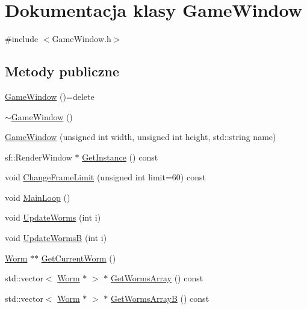 \hypertarget{class_game_window}{}\section{Dokumentacja klasy Game\+Window}
\label{class_game_window}


{\ttfamily \#include $<$Game\+Window.\+h$>$}

\subsection*{Metody publiczne}
\begin{DoxyCompactItemize}
\item 
\mbox{\hyperlink{class_game_window_aeb8fe4d63cdd9e9d3e6fdcb35d15a37c}{Game\+Window}} ()=delete
\item 
\mbox{\hyperlink{class_game_window_a55b071c0390e45c064a160c1e6baaa08}{$\sim$\+Game\+Window}} ()
\item 
\mbox{\hyperlink{class_game_window_a22da49d930c2fd26888b223049a9da18}{Game\+Window}} (unsigned int width, unsigned int height, std\+::string name)
\item 
sf\+::\+Render\+Window $\ast$ \mbox{\hyperlink{class_game_window_aa5ef8ededf54c333a5b19344b95220de}{Get\+Instance}} () const
\item 
void \mbox{\hyperlink{class_game_window_af2b8df98b008a25d8c64f67cd6f23f59}{Change\+Frame\+Limit}} (unsigned int limit=60) const
\item 
void \mbox{\hyperlink{class_game_window_a7dcdd3731da278a522c59a72ecee77b3}{Main\+Loop}} ()
\item 
void \mbox{\hyperlink{class_game_window_a043804fa483c8ea2f348b6fb1dac4e4a}{Update\+Worms}} (int i)
\item 
void \mbox{\hyperlink{class_game_window_aa6659ccbd2a5d27141eb3f00fdc72ea6}{Update\+WormsB}} (int i)
\item 
\mbox{\hyperlink{class_worm}{Worm}} $\ast$$\ast$ \mbox{\hyperlink{class_game_window_a172c7184152f5c49a5089205ae3528f5}{Get\+Current\+Worm}} ()
\item 
std\+::vector$<$ \mbox{\hyperlink{class_worm}{Worm}} $\ast$ $>$ $\ast$ \mbox{\hyperlink{class_game_window_a7535403f5d3ab3ffe22c711665102052}{Get\+Worms\+Array}} () const
\item 
std\+::vector$<$ \mbox{\hyperlink{class_worm}{Worm}} $\ast$ $>$ $\ast$ \mbox{\hyperlink{class_game_window_ab9695e10e5a991a9df920911402b9272}{Get\+Worms\+ArrayB}} () const
\item 
$$
\end{DoxyCompactItemize}
